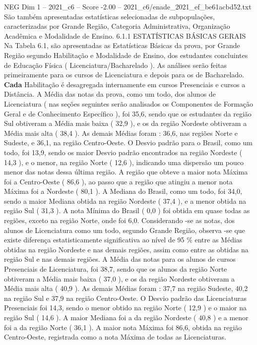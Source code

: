 \begin{textsample}{NEG Dim 1 – 2021\_c6 – Score -2.00 – 2021\_c6/enade\_2021\_ef\_be61acbd52.txt}
São também apresentadas estatísticas selecionadas de subpopulações, caracterizadas por Grande Região, Categoria Administrativa, Organização Acadêmica e Modalidade de Ensino. 6.1.1 ESTATÍSTICAS BÁSICAS GERAIS Na Tabela 6.1, são apresentadas as Estatísticas Básicas da prova, por Grande Região segundo Habilitação e Modalidade de Ensino, dos estudantes concluintes de Educação Física ( Licenciatura/Bacharelado ).
As análises serão feitas primeiramente para os cursos de Licenciatura e depois para os de Bacharelado. \textbf{Cada} Habilitação é desagregada internamente em cursos Presenciais e cursos a Distância.
A Média das notas da prova, como um todo, dos alunos de Licenciatura ( nas seções seguintes serão analisados os Componentes de Formação Geral e de Conhecimento Específico ), foi 35,6, sendo que os estudantes da região Sul obtiveram a Média mais baixa ( 32,9 ), e os da região Nordeste obtiveram a Média mais alta ( 38,4 ).
As demais Médias foram : 36,6, nas regiões Norte e Sudeste, e 36,1, na região Centro-Oeste.
O Desvio padrão para o Brasil, como um todo, foi 13,9, sendo os maior Desvio padrão encontrados na região Nordeste ( 14,3 ), e o menor, na região Norte ( 12,6 ), indicando uma dispersão um pouco menor das notas dessa última região.
A região que obteve a maior nota Máxima foi a Centro-Oeste ( 86,6 ), ao passo que a região que atingiu a menor nota Máxima foi a Nordeste ( 80,1 ).
A Mediana do Brasil, como um todo, foi 34,0, sendo a maior Mediana obtida na região Nordeste ( 37,4 ), e a menor obtida na região Sul ( 31,3 ).
A nota Mínima do Brasil ( 0,0 ) foi obtida em quase todas as regiões, exceto na região Norte, onde foi 6,0.
Considerando -se as notas, dos alunos de Licenciatura como um todo, segundo Grande Região, observa -se que existe diferença estatisticamente significativa ao nível de 95 \% entre as Médias obtidas na região Nordeste e nas demais regiões, assim como entre as obtidas na região Sul e nas demais regiões.
A Média das notas para os alunos de cursos Presenciais de Licenciatura, foi 38,7, sendo que os alunos da região Norte obtiveram a Média mais baixa ( 37,0 ), e os da região Nordeste obtiveram a Média mais alta ( 40,9 ).
As demais Médias foram : 37,7 na região Sudeste, 40,2 na região Sul e 37,9 na região Centro-Oeste.
O Desvio padrão das Licenciaturas Presenciais foi 14,3, sendo o menor obtido na região Norte ( 12,9 ) e o maior na região Sul ( 14,6 ).
A maior Mediana foi a da região Nordeste ( 40,8 ) e a menor foi a da região Norte ( 36,1 ).
A maior nota Máxima foi 86,6, obtida na região Centro-Oeste, registrada como a nota Máxima de todas as Licenciaturas.

\end{textsample}
